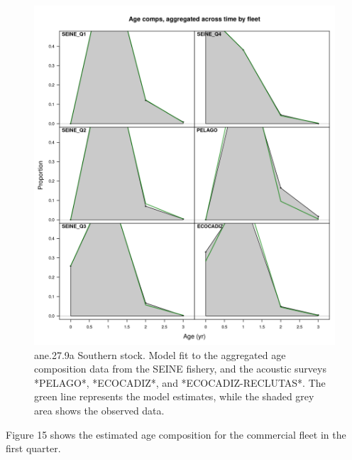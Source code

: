 \documentclass[
]{article}
\begin{document}
\begin{figure}[H]

{\centering \includegraphics[width=0.95\linewidth]{report/run/S1.0_4FLEETS_SelECO_RecIndex_Mnewfix/fig_age_fit_agg} 

}

\caption{ane.27.9a Southern stock. Model fit to the aggregated age composition data from the SEINE fishery, and the acoustic surveys *PELAGO*, *ECOCADIZ*, and *ECOCADIZ-RECLUTAS*. The green line represents the model estimates, while the shaded grey area shows the observed data.}\label{fig:unnamed-chunk-18}
\end{figure}

Figure 15 shows the estimated age composition for the commercial fleet
in the first quarter.
\end{document}
